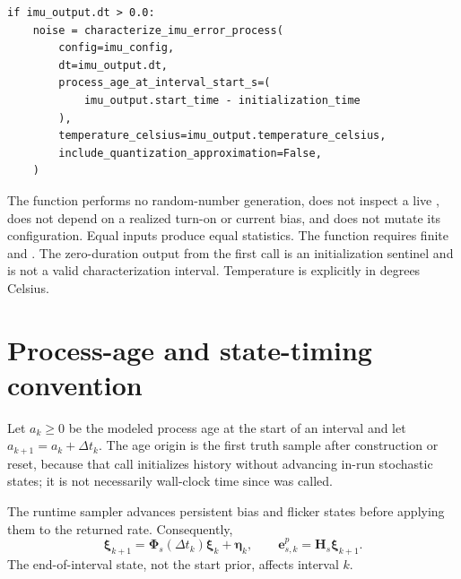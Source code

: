 \documentclass[11pt,oneside,headings=big]{scrreprt}
\newcommand{\vect}[1]{\bm{#1}}
\newcommand{\mat}[1]{\bm{#1}}
\begin{document}
    \begin{tcolorbox}[
        enhanced,breakable,colback=ImuPaleTeal,colframe=ImuTeal,
        title={Pure characterization contract},fonttitle=\bfseries]
        \begin{lstlisting}[style=imuPython]
if imu_output.dt > 0.0:
    noise = characterize_imu_error_process(
        config=imu_config,
        dt=imu_output.dt,
        process_age_at_interval_start_s=(
            imu_output.start_time - initialization_time
        ),
        temperature_celsius=imu_output.temperature_celsius,
        include_quantization_approximation=False,
    )
        \end{lstlisting}
        The function performs no random-number generation, does not inspect a live
        , does not depend on a realized turn-on or current bias, and
        does not mutate its configuration. Equal inputs produce equal statistics.
        The function requires finite  and
        . The zero-duration output
        from the first  call is an initialization sentinel and is not a
        valid characterization interval. Temperature is explicitly in degrees Celsius.
    \end{tcolorbox}


    \section{Process-age and state-timing convention}
    Let $a_k\ge0$ be the modeled process age at the start of an interval and let
    $a_{k+1}=a_k+\Delta t_k$. The age origin is the first truth sample after
    construction or reset, because that call initializes history without advancing
    in-run stochastic states; it is not necessarily wall-clock time since
     was called.

    The runtime sampler advances persistent bias and flicker states before applying
    them to the returned rate. Consequently,
    \begin{equation}
        \boldsymbol\xi_{k+1}
        =\mat\Phi_s(\Delta t_k)\boldsymbol\xi_k+\vect\eta_k,
        \qquad
        \vect e^p_{s,k}=\mat H_s\boldsymbol\xi_{k+1}.
        \label{eq:characterization-timing}
    \end{equation}
    The end-of-interval state, not the start prior, affects interval $k$.
\end{document}
